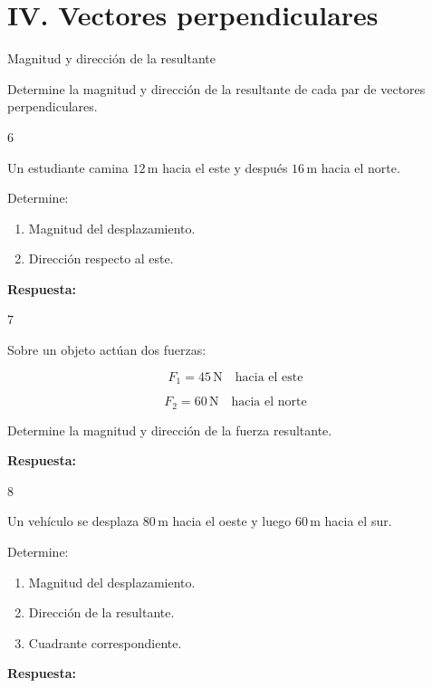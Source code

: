 \documentclass[11pt,letterpaper]{article}
\newcommand{\respuesta}{
\vspace{0.3cm}
\textcolor{morado}{\textbf{Respuesta:}}
\hrulefill
\vspace{0.3cm}
}
\newcommand{\espacio}[1]{
\vspace{#1}
}
\begin{document}
\newpage

\section*{IV. Vectores perpendiculares}

\begin{seccion}{
Magnitud y dirección de la resultante
}

Determine la magnitud y dirección
de la resultante de cada par
de vectores perpendiculares.

\end{seccion}

\begin{ejercicio}{6}

Un estudiante camina
$12\,\mathrm{m}$ hacia el este
y después $16\,\mathrm{m}$
hacia el norte.

Determine:

\begin{enumerate}[label=\alph*)]
\item Magnitud del desplazamiento.
\item Dirección respecto al este.
\end{enumerate}

\espacio{4cm}

\respuesta

\end{ejercicio}

\begin{ejercicio}{7}

Sobre un objeto actúan dos fuerzas:

\[
F_1=45\,\mathrm{N}
\quad\text{hacia el este}
\]

\[
F_2=60\,\mathrm{N}
\quad\text{hacia el norte}
\]

Determine la magnitud y dirección
de la fuerza resultante.

\espacio{4cm}

\respuesta

\end{ejercicio}

\begin{ejercicio}{8}

Un vehículo se desplaza
$80\,\mathrm{m}$ hacia el oeste
y luego $60\,\mathrm{m}$
hacia el sur.

Determine:

\begin{enumerate}[label=\alph*)]
\item Magnitud del desplazamiento.
\item Dirección de la resultante.
\item Cuadrante correspondiente.
\end{enumerate}

\espacio{4cm}

\respuesta

\end{ejercicio}
\end{document}
